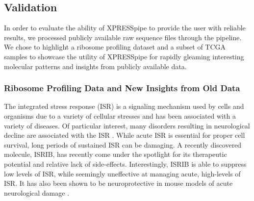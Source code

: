 \documentclass[11pt, a4paper, oneside]{article}
\begin{document}
\subsection{Validation}
In order to evaluate the ability of XPRESSpipe to provide the user with reliable results, we processed publicly available raw sequence files through the pipeline. We chose to highlight a ribosome profiling dataset and a subset of TCGA samples to showcase the utility of XPRESSpipe for rapidly gleaming interesting molecular patterns and insights from publicly available data.

\subsubsection{Ribosome Profiling Data and New Insights from Old Data}
The integrated stress response (ISR) is a signaling mechanism used by cells and organisms due to a variety of cellular stresses and has been associated with a variety of diseases. Of particular interest, many disorders resulting in neurological decline are associated with the ISR \cite{isr_disease}. While acute ISR is essential for proper cell survival, long periods of sustained ISR can be damaging. A recently discovered molecule, ISRIB, has recently come under the spotlight for its therapeutic potential and relative lack of side-effects. Interestingly, ISRIB is able to suppress low levels of ISR, while seemingly uneffective at managing acute, high-levels of ISR. It has also been shown to be neuroprotective in mouse models of acute neurological damage \cite{isrib_activation, isrib_structure, isrib_riboseq, isrib_neuroprotective}. \par
\end{document}
